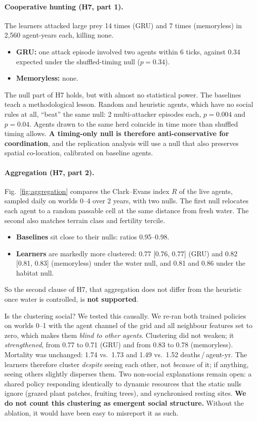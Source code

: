 \documentclass[10pt]{article}
\newcommand{\dpay}{deaths\,/\,agent-yr}
\begin{document}
\paragraph{Cooperative hunting (H7, part 1).}
The learners attacked large prey 14 times (GRU) and 7 times (memoryless) in 2{,}560 agent-years each, killing none.
\begin{itemize}
\item \textbf{GRU:} one attack episode involved two agents within 6 ticks, against 0.34 expected under the
shuffled-timing null ($p=0.34$).
\item \textbf{Memoryless:} none.
\end{itemize}
The null part of H7 holds, but with almost no statistical power. The baselines teach a methodological lesson. Random
and heuristic agents, which have no social rules at all, ``beat'' the same null: 2 multi-attacker episodes each,
$p=0.004$ and $p=0.04$. Agents drawn to the same herd coincide in time more than shuffled timing allows. \textbf{A
timing-only null is therefore anti-conservative for coordination}, and the replication analysis will use a null that
also preserves spatial co-location, calibrated on baseline agents.

\paragraph{Aggregation (H7, part 2).}
Fig.~\ref{fig:aggregation} compares the Clark--Evans index $R$ \citep{clark1954distance} of the live agents, sampled
daily on worlds 0--4 over 2 years, with two nulls. The first null relocates each agent to a random passable cell at
the same distance from fresh water. The second also matches terrain class and fertility tercile.
\begin{itemize}
\item \textbf{Baselines} sit close to their nulls: ratios 0.95--0.98.
\item \textbf{Learners} are markedly more clustered: 0.77 [0.76, 0.77] (GRU) and 0.82 [0.81, 0.83] (memoryless)
under the water null, and 0.81 and 0.86 under the habitat null.
\end{itemize}
So the second clause of H7, that aggregation does not differ from the heuristic once water is controlled, is
\textbf{not supported}.

Is the clustering social? We tested this causally. We re-ran both trained policies on worlds 0--1 with the agent
channel of the grid and all neighbour features set to zero, which makes them \emph{blind to other agents}. Clustering
did not weaken; it \emph{strengthened}, from 0.77 to 0.71 (GRU) and from 0.83 to 0.78 (memoryless). Mortality was
unchanged: 1.74 vs.\ 1.73 and 1.49 vs.\ 1.52 \dpay{}. The learners therefore cluster \emph{despite} seeing each other,
not \emph{because} of it; if anything, seeing others slightly disperses them. Two non-social explanations remain
open: a shared policy responding identically to dynamic resources that the static nulls ignore (grazed plant patches,
fruiting trees), and synchronised resting sites. \textbf{We do not count this clustering as emergent social
structure.} Without the ablation, it would have been easy to misreport it as such.
\end{document}
